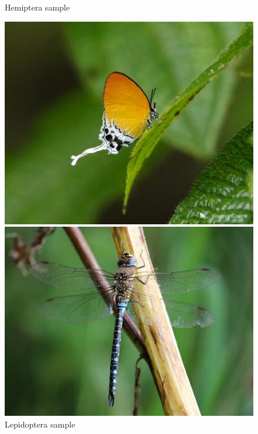 \begin{figure}[!ht]
\begin{minipage}[t]{.4\textwidth}
        \caption{Hemiptera sample}
        \label{fig:hemiptera-sample}
    \end{minipage}
    \begin{minipage}[t]{.4\textwidth}
        \vspace{0.3cm}
        \includegraphics[width=\textwidth]{images/01471_Lepidoptera_Lycaenidae_6ba490d2-8d07-4d44-97b3-b8f1fc48b5b5.jpg}
        \caption{Lepidoptera sample}
        \label{fig:lepidoptera-sample}
    \end{minipage}
    \hfill
    \begin{minipage}[t]{.4\textwidth}
        \vspace{0.3cm}
        \includegraphics[width=\textwidth]{images/02312_Odonata_Aeshnidae_1aefce10-69b6-456a-88ad-ae1d3a11b2e6.jpg}

\end{minipage}
\end{figure}
